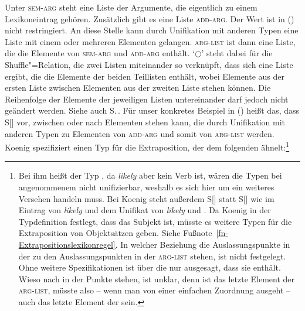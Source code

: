 \ea
\label{koenig-likely}
\z
Unter \textsc{sem-arg} steht eine Liste der Argumente, die eigentlich zu einem
Lexikoneintrag gehören. Zusätzlich gibt es eine Liste \textsc{add-arg}. Der Wert
ist in () nicht restringiert. An diese Stelle kann durch Unifikation mit
anderen Typen eine Liste mit einem oder mehreren Elementen gelangen. \textsc{arg-list}
ist dann eine Liste, die die Elemente von \textsc{sem-arg} und \textsc{add-arg} enthält.
`$\bigcirc$'\is{$\bigcirc$}
steht dabei für die Shuffle"=Relation, die zwei Listen miteinander so
verknüpft, dass sich eine Liste ergibt, die die Elemente der beiden Teillisten enthält,
wobei Elemente aus der ersten Liste zwischen Elementen aus der zweiten Liste stehen können.
Die Reihenfolge der Elemente der jeweiligen Listen untereinander darf jedoch nicht geändert
werden. Siehe auch S.\,\pageref{rel-shuffle}. Für unser konkretes Beispiel in
() heißt das, dass S[] vor, zwischen oder nach Elementen stehen kann,
die durch Unifikation mit anderen Typen zu Elementen von \textsc{add-arg} und somit
von \textsc{arg-list} werden. Koenig spezifiziert einen Typ für die Extraposition,
der dem folgenden ähnelt:\footnote{
  Bei ihm heißt der Typ , da \emph{likely} aber kein Verb ist,
  wären die Typen bei angenommenem \headw {} nicht unifizierbar, weshalb es sich hier um ein weiteres
  Versehen handeln muss. Bei Koenig steht außerdem S[] statt S[]
  wie im Eintrag von \emph{likely} und dem Unifikat von \emph{likely} und . Da
  Koenig in der Typdefinition festlegt, dass  das Subjekt ist, müsste es weitere Typen für
  die Extraposition von Objektsätzen geben. Siehe Fußnote~\ref{fn-Extrapositionslexikonregel}. In
  welcher Beziehung die Auslassungspunkte in der \compsl zu den Auslassungspunkten in der
  \textsc{arg-list} stehen, ist nicht festgelegt. Ohne weitere Spezifikationen ist über die \compsl
  nur ausgesagt, dass sie  enthält. Wieso nach  in der \compsl Punkte stehen, ist unklar, denn  ist das letzte Element der
  \textsc{arg-list}, müsste also -- wenn man von einer einfachen Zuordnung ausgeht -- auch das letzte Element der \compsl sein. %
}

